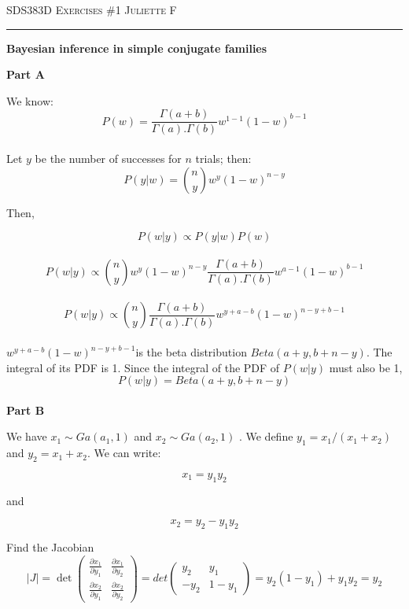 \documentclass[12pt]{amsart}
\begin{document}
\thispagestyle{empty}

{\scshape SDS383D} \hfill {\scshape \Large Exercises \#1} \hfill {\scshape Juliette F}
 \medskip
\hrule
\bigskip
\bigskip

{\bf \large Bayesian inference in simple conjugate families} 
\bigskip



{\bf Part A} \\
\bigskip

We know:\\
$$P(w) = \frac{\Gamma(a+b)}{\Gamma(a).\Gamma(b)}w^{1-1}(1-w)^{b-1}$$ \\

Let $y$ be the number of successes for $n$ trials; then: \\

$$ P(y|w) = {n \choose y}w^{y}(1-w)^{n-y} $$


Then,

$$ P(w|y) \propto P(y|w)P(w) $$ \\

$$ P(w|y) \propto {n \choose y}w^{y}(1-w)^{n-y}
\frac{\Gamma(a+b)}{\Gamma(a).\Gamma(b)}w^{a-1}(1-w)^{b-1}$$ \\


$$ P(w|y) \propto {n \choose y} \frac{\Gamma(a+b)}{\Gamma(a).\Gamma(b)}w^{y+a-b}(1-w)^{n-y+b-1} 
$$ \\
 
$ w^{y+a-b}(1-w)^{n-y+b-1}  $is the beta distribution $Beta(a+y, b+n-y)$. The integral of its PDF is 1. Since the integral of the PDF of $P(w|y)$ must also be 1,  \\

$$ P(w|y) = Beta(a+y, b+n-y)$$\\


{\bf Part B} \\
\bigskip

We have $x_1 \sim Ga(a_1, 1)$ and  $x_2 \sim Ga(a_2, 1)$ . We define $y_1 = x_1/(x_1 + x_2)$ and $y_2 = x_1 + x_2$. We can write:

$$x_1 = y_1y_2  $$

and

$$x_2 = y_2 - y_1y_2  $$

Find the Jacobian\\

$$|J|= \det\begin{pmatrix} \frac{\partial x_1}{\partial y_1} & \frac{\partial x_1}{\partial y_2} \\ \frac{\partial x_2}{\partial y_1} & \frac{\partial x_2}{\partial y_2} \end{pmatrix} =det\begin{pmatrix}
  y_2 & y_1\\ 
  -y_2 & 1-y_1 
\end{pmatrix} = y_2(1-y_1) + y_1y_2 = y_2
 $$\\
 
\end{document}
